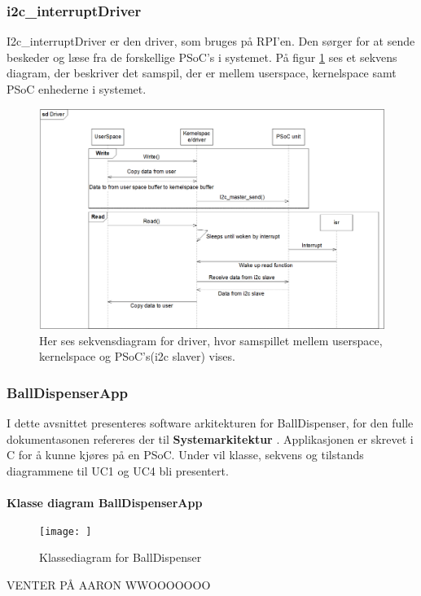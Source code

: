 \documentclass[Rapport/Rapport_main.tex]{subfiles}
\begin{document}
\subsubsection{i2c\_interruptDriver}
I2c\_interruptDriver er den driver, som bruges på RPI'en. Den sørger for at sende beskeder og læse fra de forskellige PSoC's i systemet. På figur \ref{fig:driver_sekvensdiagram} ses et sekvens diagram, der beskriver det samspil, der er mellem userspace, kernelspace samt PSoC enhederne i systemet. 
\begin{figure}[H]
    \centering
    \includegraphics[width=\textwidth]{Rapport/Arkitektur/graphics/driver_sekvensdiagram.png}
    \caption{Her ses sekvensdiagram for driver, hvor samspillet mellem userspace, kernelspace og PSoC's(i2c slaver) vises.}
    \label{fig:driver_sekvensdiagram}
\end{figure}





\subsubsection{BallDispenserApp}
I dette avsnittet presenteres software arkitekturen for BallDispenser, for den fulle dokumentasonen refereres der til \textbf{Systemarkitektur} . Applikasjonen er skrevet i C for å kunne kjøres på en PSoC. Under vil klasse, sekvens og tilstands diagrammene til UC1 og UC4 bli presentert.\\\\
\textbf{Klasse diagram BallDispenserApp}\\
\begin{figure}
    \centering
    \texttt{[image: ]}
    \caption{Klassediagram for BallDispenser}
    \label{fig:BallDipKlasse}
\end{figure}
{\color{Red} \Large VENTER PÅ AARON WWOOOOOOO }
\end{document}
